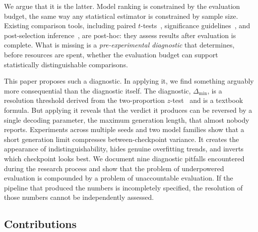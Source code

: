 \documentclass[pdflatex,sn-mathphys-ay,iicol]{sn-jnl}
\theoremstyle{thmstylethree}
\begin{document}
We argue that it is the latter. Model ranking is constrained by the evaluation budget, the same way any statistical estimator is constrained by sample size. Existing comparison tools, including paired $t$-tests~\citep{dietterich1998approximate}, significance guidelines~\citep{dror2018hitchhiker}, and post-selection inference~\citep{zrnic2024flexible,zhang2024winners}, are post-hoc: they assess results after evaluation is complete. What is missing is a \emph{pre-experimental diagnostic} that determines, before resources are spent, whether the evaluation budget can support statistically distinguishable comparisons.

This paper proposes such a diagnostic. In applying it, we find something arguably more consequential than the diagnostic itself. The diagnostic, $\Delta_{\min}$, is a resolution threshold derived from the two-proportion $z$-test~\citep{cohen1988statistical} and is a textbook formula. But applying it reveals that the verdict it produces can be reversed by a single decoding parameter, the maximum generation length, that almost nobody reports. Experiments across multiple seeds and two model families show that a short generation limit compresses between-checkpoint variance. It creates the appearance of indistinguishability, hides genuine overfitting trends, and inverts which checkpoint looks best. We document nine diagnostic pitfalls encountered during the research process and show that the problem of underpowered evaluation is compounded by a problem of unaccountable evaluation. If the pipeline that produced the numbers is incompletely specified, the resolution of those numbers cannot be independently assessed.

\subsection*{Contributions}
\end{document}
